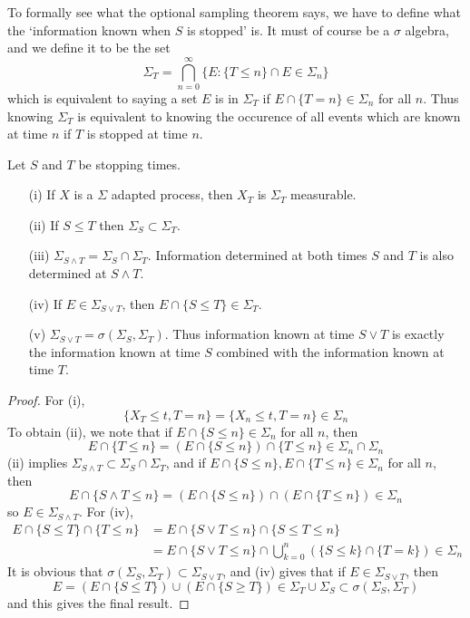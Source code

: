 To formally see what the optional sampling theorem says, we have to define what the `information known when $S$ is stopped' is. It must of course be a $\sigma$ algebra, and we define it to be the set
%
\[ \Sigma_T = \bigcap_{n = 0}^\infty \{ E: \{ T \leq n \} \cap E \in \Sigma_n \} \]
%
which is equivalent to saying a set $E$ is in $\Sigma_T$ if $E \cap \{ T = n \} \in \Sigma_n$ for all $n$. Thus knowing $\Sigma_T$ is equivalent to knowing the occurence of all events which are known at time $n$ if $T$ is stopped at time $n$.

\begin{lemma}
    Let $S$ and $T$ be stopping times.
    \begin{itemize}
        \item[(i)] If $X$ is a $\Sigma$ adapted process, then $X_T$ is $\Sigma_T$ measurable.
        \item[(ii)] If $S \leq T$ then $\Sigma_S \subset \Sigma_T$.
        \item[(iii)] $\Sigma_{S \wedge T} = \Sigma_S \cap \Sigma_T$. Information determined at both times $S$ and $T$ is also determined at $S \wedge T$.
        \item[(iv)] If $E \in \Sigma_{S \vee T}$, then $E \cap \{ S \leq T \} \in \Sigma_T$.
        \item[(v)] $\Sigma_{S \vee T} = \sigma(\Sigma_S, \Sigma_T)$. Thus information known at time $S \vee T$ is exactly the information known at time $S$ combined with the information known at time $T$.
    \end{itemize}
\end{lemma}
\begin{proof}
    For (i),
    \[ \{ X_T \leq t, T = n \} = \{ X_n \leq t, T = n \} \in \Sigma_n \]
    To obtain (ii), we note that if $E \cap \{ S \leq n \} \in \Sigma_n$ for all $n$, then
    \[ E \cap \{ T \leq n \} = (E \cap \{ S \leq n \}) \cap \{ T \leq n \} \in \Sigma_n \cap \Sigma_n \]
    (ii) implies $\Sigma_{S \wedge T} \subset \Sigma_S \cap \Sigma_T$, and if $E \cap \{ S \leq n \}, E \cap \{ T \leq n \} \in \Sigma_n$ for all $n$, then
    \[ E \cap \{ S \wedge T \leq n \} = (E \cap \{ S \leq n \}) \cap (E \cap \{ T \leq n \}) \in \Sigma_n \]
    so $E \in \Sigma_{S \wedge T}$. For (iv),
    \begin{align*}
        E \cap \{ S \leq T \} \cap \{ T \leq n \} &= E \cap \{ S \vee T \leq n \} \cap \{ S \leq T \leq n \}\\
        &= E \cap \{ S \vee T \leq n \} \cap \bigcup_{k = 0}^n (\{ S \leq k \} \cap \{ T = k \}) \in \Sigma_n
    \end{align*}
    It is obvious that $\sigma(\Sigma_S, \Sigma_T) \subset \Sigma_{S \vee T}$, and (iv) gives that if $E \in \Sigma_{S \vee T}$, then
    \[ E = (E \cap \{ S \leq T \}) \cup (E \cap \{ S \geq T \}) \in \Sigma_T \cup \Sigma_S \subset \sigma(\Sigma_S, \Sigma_T) \]
    and this gives the final result.
\end{proof}

